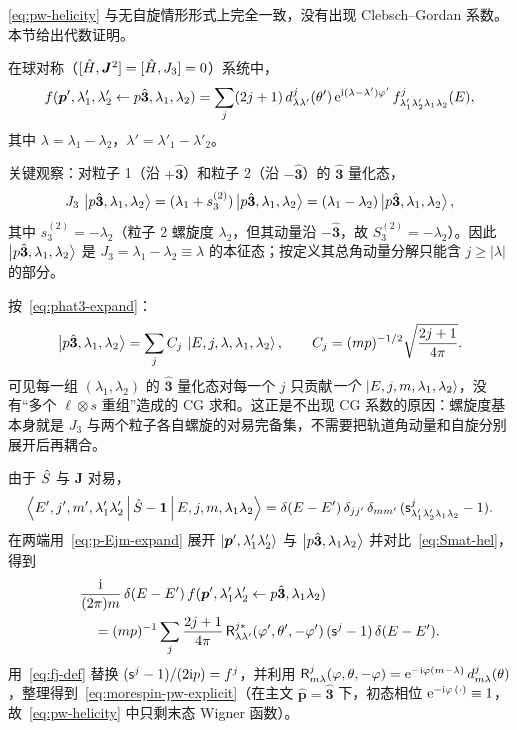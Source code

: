 \eqref{eq:pw-helicity} 与无自旋情形形式上完全一致，没有出现 Clebsch--Gordan 系数。本节给出代数证明。

\begin{theorem}[螺旋度基下的分波展开公式]
\label{thm:morespin-pw}
在球对称（$[\hat{H},\bm J^2]=[\hat{H},J_3]=0$）系统中，
\begin{equation}
f(\bm p',\lambda'_1,\lambda'_2 \leftarrow p\hat{\bm 3},\lambda_1,\lambda_2)
=\sum_j (2j+1)\,d^{j}_{\lambda\lambda'}(\theta')\,\mathrm{e}^{\mathrm{i}(\lambda-\lambda')\varphi'}\,
f^{j}_{\lambda'_1\lambda'_2\lambda_1\lambda_2}(E),
\label{eq:morespin-pw-explicit}
\end{equation}
其中 $\lambda=\lambda_1-\lambda_2$，$\lambda'=\lambda'_1-\lambda'_2$。
\end{theorem}

\begin{proof*}
关键观察：对粒子 1（沿 $+\hat{\bm 3}$）和粒子 2（沿 $-\hat{\bm 3}$）的 $\hat{\bm 3}$ 量化态，
$$
J_3\,\ket{p\hat{\bm 3},\lambda_1,\lambda_2}=(\lambda_1+s_3^{(2)})\ket{p\hat{\bm 3},\lambda_1,\lambda_2}=(\lambda_1-\lambda_2)\ket{p\hat{\bm 3},\lambda_1,\lambda_2},
$$
其中 $s_3^{(2)}=-\lambda_2$（粒子 2 螺旋度 $\lambda_2$，但其动量沿 $-\hat{\bm 3}$，故 $S_3^{(2)}=-\lambda_2$）。因此 $\ket{p\hat{\bm 3},\lambda_1,\lambda_2}$ 是 $J_3=\lambda_1-\lambda_2\equiv\lambda$ 的本征态；按定义其总角动量分解只能含 $j\geq |\lambda|$ 的部分。

按~\eqref{eq:phat3-expand}：
$$
\ket{p\hat{\bm 3},\lambda_1,\lambda_2}=\sum_j C_j\,\ket{E,j,\lambda,\lambda_1,\lambda_2},\qquad C_j=(mp)^{-1/2}\sqrt{\frac{2j+1}{4\pi}}.
$$
可见每一组 $(\lambda_1,\lambda_2)$ 的 $\hat{\bm 3}$ 量化态对每一个 $j$ 只贡献\emph{一个} $\ket{E,j,m,\lambda_1,\lambda_2}$，没有“多个 $\ell\otimes s$ 重组”造成的 CG 求和。这正是不出现 CG 系数的原因：螺旋度基本身就是 $J_3$ 与两个粒子各自螺旋的对易完备集，不需要把轨道角动量和自旋分别展开后再耦合。

由于 $\hat{S}$ 与 $\bm J$ 对易，
$$
\left\langle E',j',m',\lambda'_1\lambda'_2 \,\middle|\, \hat{S}-\mathbf 1 \,\middle|\, E,j,m,\lambda_1\lambda_2 \right\rangle
=\delta(E-E')\,\delta_{jj'}\,\delta_{mm'}\,(\mathsf s^j_{\lambda'_1\lambda'_2\lambda_1\lambda_2}-1).
$$
在两端用~\eqref{eq:p-Ejm-expand} 展开 $\ket{\bm p',\lambda'_1\lambda'_2}$ 与 $\ket{p\hat{\bm 3},\lambda_1\lambda_2}$ 并对比~\eqref{eq:Smat-hel}，得到
\begin{align*}
&\frac{\mathrm{i}}{(2\pi)m}\,\delta(E-E')\,f(\bm p',\lambda'_1\lambda'_2\leftarrow p\hat{\bm 3},\lambda_1\lambda_2)\\
&\quad =(mp)^{-1}\sum_j\frac{2j+1}{4\pi}\,\mathsf R^{j*}_{\lambda\lambda'}(\varphi',\theta',-\varphi')\,(\mathsf s^j-1)\,\delta(E-E').
\end{align*}
用~\eqref{eq:fj-def} 替换 $(\mathsf s^j-1)/(2\mathrm{i} p)=f^j$，并利用 $\mathsf R^j_{m\lambda}(\varphi,\theta,-\varphi)=\mathrm{e}^{-\mathrm{i}\varphi(m-\lambda)}\,d^{j}_{m\lambda}(\theta)$，整理得到~\eqref{eq:morespin-pw-explicit}（在主文 $\hat{\bm p}=\hat{\bm 3}$ 下，初态相位 $\mathrm{e}^{-\mathrm{i}\varphi\,(\cdot)}\equiv 1$，故~\eqref{eq:pw-helicity} 中只剩末态 Wigner 函数）。
\end{proof*}

